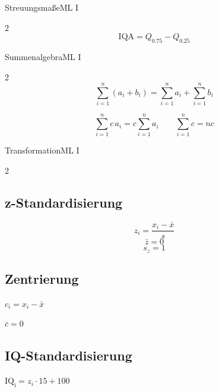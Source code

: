 \begin{formulaBox}{Streuungsmaße}{ML I}
\begin{multicols}{2}
\begin{equation*}
\mathrm{IQA}=Q_{0.75}-Q_{0.25}
\end{equation*}
\vspace{0.1mm}


\end{multicols}
\end{formulaBox}

\begin{formulaBox}{Summenalgebra}{ML I}
\begin{multicols}{2}
\[
\sum_{i=1}^{n}(a_i+b_i)
  = \sum_{i=1}^{n}a_i + \sum_{i=1}^{n}b_i
\]

\columnbreak

\[
\sum_{i=1}^{n}c\,a_i
  = c\sum_{i=1}^{n}a_i
\qquad
\sum_{i=1}^{n}c = n c
\]
\end{multicols}
\end{formulaBox}

\begin{formulaBox}{Transformation}{ML I}
\begin{multicols}{2}
\subsection*{z-Standardisierung}
$$z_{i}= \frac{x_{i}-\bar{x}}{{s}}$$
$$\bar{z}=0$$
$$s_z=1$$

\subsection*{Zentrierung}

$c_{i} = x_i - \bar{x}$

$\bar{c}=0$

\subsection*{IQ-Standardisierung}
$\mathrm{IQ_i} = z_i \cdot 15 + 100$\
\end{multicols}
\end{formulaBox}
